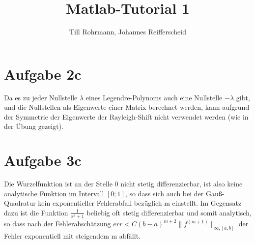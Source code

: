 \documentclass[german]{article}
\author{Till Rohrmann, Johannes Reifferscheid}
\title{
	Matlab-Tutorial 1
}
\begin{document}
  \maketitle
 
  \section{Aufgabe 2c}

Da es zu jeder Nullstelle $\lambda$ eines Legendre-Polynoms auch eine Nullstelle $-\lambda$ gibt, und die Nullstellen als Eigenwerte einer Matrix berechnet werden, kann aufgrund der Symmetrie der Eigenwerte der Rayleigh-Shift nicht verwendet werden (wie in der Übung gezeigt).

\section{Aufgabe 3c}

Die Wurzelfunktion ist an der Stelle 0 nicht stetig differenzierbar, ist also keine analytische Funktion im Intervall $[0;1]$, so dass sich auch bei der Gauß-Quadratur kein exponentieller Fehlerabfall bezüglich m einstellt. Im Gegensatz dazu ist die Funktion $\frac{1}{x^2+1}$ beliebig oft stetig differenzierbar und somit analytisch, so dass nach der Fehlerabschätzung $err < C (b-a)^{m+2} \|f^{(m+1)}\|_{\infty,[a,b]}$ der Fehler exponentiell mit steigendem m abfällt.
  
\end{document}
